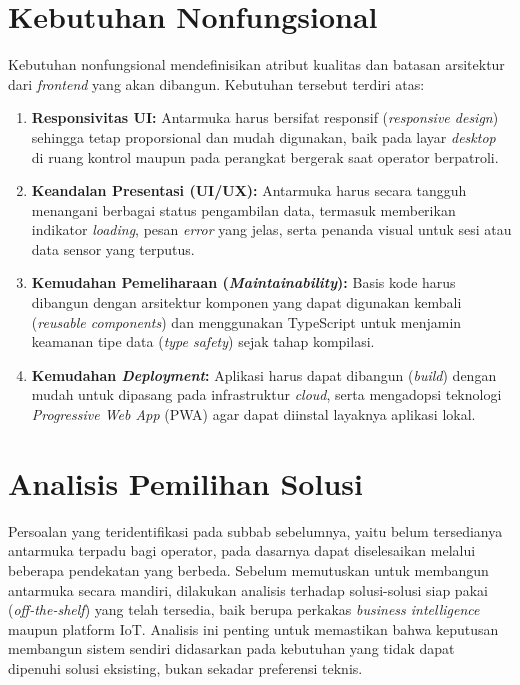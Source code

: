 \section{Kebutuhan Nonfungsional}
Kebutuhan nonfungsional mendefinisikan atribut kualitas dan batasan arsitektur 
dari \textit{frontend} yang akan dibangun. Kebutuhan tersebut terdiri atas:
\begin{enumerate}
    \item \textbf{Responsivitas UI:} Antarmuka harus bersifat responsif (\textit{responsive design}) 
    sehingga tetap proporsional dan mudah digunakan, baik pada layar \textit{desktop} di 
    ruang kontrol maupun pada perangkat bergerak saat operator berpatroli.
    \item \textbf{Keandalan Presentasi (UI/UX):} Antarmuka harus secara tangguh menangani 
    berbagai status pengambilan data, termasuk memberikan indikator \textit{loading}, 
    pesan \textit{error} yang jelas, serta penanda visual untuk sesi atau data sensor yang terputus.
    \item \textbf{Kemudahan Pemeliharaan (\textit{Maintainability}):} Basis kode harus dibangun 
    dengan arsitektur komponen yang dapat digunakan kembali (\textit{reusable components}) 
    dan menggunakan TypeScript untuk menjamin keamanan tipe data (\textit{type safety}) 
    sejak tahap kompilasi.
    \item \textbf{Kemudahan \textit{Deployment}:} Aplikasi harus dapat dibangun (\textit{build}) 
    dengan mudah untuk dipasang pada infrastruktur \textit{cloud}, serta mengadopsi 
    teknologi \textit{Progressive Web App} (PWA) agar dapat diinstal layaknya aplikasi lokal.
\end{enumerate}

\section{Analisis Pemilihan Solusi}

Persoalan yang teridentifikasi pada subbab sebelumnya, yaitu belum tersedianya antarmuka terpadu bagi operator, 
pada dasarnya dapat diselesaikan melalui beberapa pendekatan yang berbeda. Sebelum memutuskan untuk membangun 
antarmuka secara mandiri, dilakukan analisis terhadap solusi-solusi siap pakai (\textit{off-the-shelf}) yang 
telah tersedia, baik berupa perkakas \textit{business intelligence} maupun platform IoT. Analisis ini penting 
untuk memastikan bahwa keputusan membangun sistem sendiri didasarkan pada kebutuhan yang tidak dapat dipenuhi 
solusi eksisting, bukan sekadar preferensi teknis.

